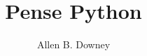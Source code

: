 \documentclass[10pt]{book}
\title{Pense Python}
\author{Allen B. Downey}
\newif\ifplastex
\begin{document}
\frontmatter

\ifplastex
    \usepackage{localdef}
    \maketitle

\newcount\anchorcnt
\newcommand*{\Anchor}[1]{%
  \@bsphack%
    \Hy@GlobalStepCount\anchorcnt%
    \edef\@currentHref{anchor.\the\anchorcnt}%
    \Hy@raisedlink{\hyper@anchorstart{\@currentHref}\hyper@anchorend}%
    \M@gettitle{}\label{#1}%
    \@esphack%
}


\else

\newtheorem{exercise}{Exercise}[chapter]



\end{document}
